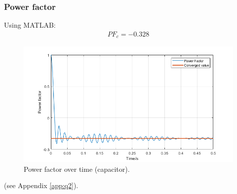 \subsubsection{Power factor}
Using MATLAB:
\begin{gather}
    PF_{c} = -0.328
\end{gather}
\begin{figure}[H]
    \centering
    \includegraphics[width = \textwidth]{img/figure11.png}
    \caption{Power factor over time (capacitor).}
    \label{fig:PFCapacitor}
\end{figure}
(see Appendix \ref{app:q2}).